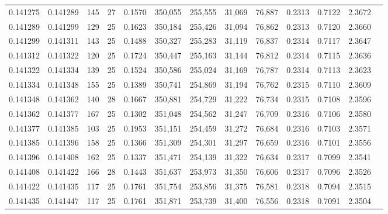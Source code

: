 \begin{tabular}{rrrrrrrrrrrrr}
0.141275 & 0.141289 &   145 &  27 &                                     0.1570 & 350,055 & 255,555 &  31,069 &  76,887 & 0.2313 & 0.7122 & 2.3672 \\
0.141289 & 0.141299 &   129 &  25 &                                     0.1623 & 350,184 & 255,426 &  31,094 &  76,862 & 0.2313 & 0.7120 & 2.3660 \\
0.141299 & 0.141311 &   143 &  25 &                                     0.1488 & 350,327 & 255,283 &  31,119 &  76,837 & 0.2314 & 0.7117 & 2.3647 \\
0.141312 & 0.141322 &   120 &  25 &                                     0.1724 & 350,447 & 255,163 &  31,144 &  76,812 & 0.2314 & 0.7115 & 2.3636 \\
0.141322 & 0.141334 &   139 &  25 &                                     0.1524 & 350,586 & 255,024 &  31,169 &  76,787 & 0.2314 & 0.7113 & 2.3623 \\
0.141334 & 0.141348 &   155 &  25 &                                     0.1389 & 350,741 & 254,869 &  31,194 &  76,762 & 0.2315 & 0.7110 & 2.3609 \\
0.141348 & 0.141362 &   140 &  28 &                                     0.1667 & 350,881 & 254,729 &  31,222 &  76,734 & 0.2315 & 0.7108 & 2.3596 \\
0.141362 & 0.141377 &   167 &  25 &                                     0.1302 & 351,048 & 254,562 &  31,247 &  76,709 & 0.2316 & 0.7106 & 2.3580 \\
0.141377 & 0.141385 &   103 &  25 &                                     0.1953 & 351,151 & 254,459 &  31,272 &  76,684 & 0.2316 & 0.7103 & 2.3571 \\
0.141385 & 0.141396 &   158 &  25 &                                     0.1366 & 351,309 & 254,301 &  31,297 &  76,659 & 0.2316 & 0.7101 & 2.3556 \\
0.141396 & 0.141408 &   162 &  25 &                                     0.1337 & 351,471 & 254,139 &  31,322 &  76,634 & 0.2317 & 0.7099 & 2.3541 \\
0.141408 & 0.141422 &   166 &  28 &                                     0.1443 & 351,637 & 253,973 &  31,350 &  76,606 & 0.2317 & 0.7096 & 2.3526 \\
0.141422 & 0.141435 &   117 &  25 &                                     0.1761 & 351,754 & 253,856 &  31,375 &  76,581 & 0.2318 & 0.7094 & 2.3515 \\
0.141435 & 0.141447 &   117 &  25 &                                     0.1761 & 351,871 & 253,739 &  31,400 &  76,556 & 0.2318 & 0.7091 & 2.3504 \\

\end{tabular}
